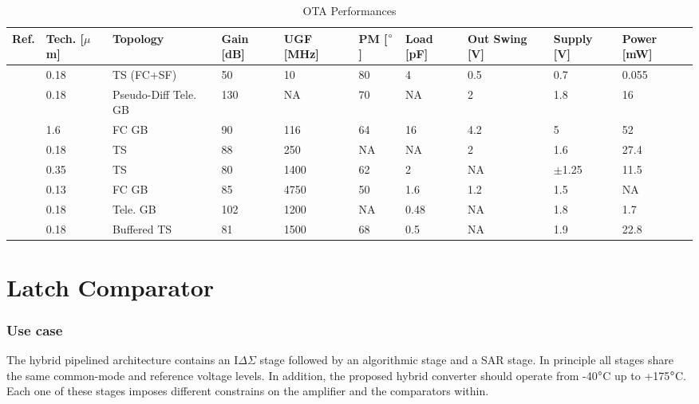 \begin{table}[htp]
	\caption{OTA Performances}
	\centering
	\label{table:ota_comparison_table}
	\begin{tabular}{L{5\charwidth} L{4.2\charwidth} L{11\charwidth} R{4.5\charwidth} R{4.5\charwidth} R{3.5\charwidth} R{4.5\charwidth} C{9\charwidth} C{6.2\charwidth} C{5.5\charwidth}}
	\toprule
	Ref. & Tech. [\(\mu \)m] & Topology & Gain [dB] & UGF [MHz] & PM [\(\degree \)] & Load [pF] & Out Swing [V] & Supply [V] & Power [mW] \\
    \midrule
    \cite{Sauerbrey2002}  & 0.18 & TS (FC+SF\footnotemark[1]) & 50  &   10 & 80 & 4    & 0.5 & 0.7 & 0.055 \\
    \cite{Chiu2004}       & 0.18 & Pseudo-Diff Tele. GB       & 130 &   NA & 70 &   NA & 2\footnotemark[2] & 1.8 & 16 \\
    \cite{Bult1991}       &  1.6 & FC GB                      & 90  &  116 & 64 & 16   & 4.2 & 5 & 52 \\
    \cite{Miyahara2014}   & 0.18 & TS                         & 88  &  250 & NA &   NA & 2\footnotemark[2] & 1.6 & 27.4 \\
    \cite{Thandri2006}    & 0.35 & TS                         & 80  & 1400 & 62 &  2   & NA & \(\pm \)1.25 & 11.5 \\
    \cite{Zhang2015PRIME} & 0.13 & FC GB                      & 85  & 4750 & 50 &  1.6 & 1.2 & 1.5 & NA \\
    \cite{Liu2015OpAmp}   & 0.18 & Tele. GB                   & 102 & 1200 & NA & 0.48 & NA  & 1.8 & 1.7 \\
    \cite{Sun2016}        & 0.18 & Buffered TS                & 81  & 1500 & 68 &  0.5 & NA  & 1.9 & 22.8 \\
	\bottomrule
	\end{tabular}
\end{table}

\section{Latch Comparator}                       %
\label{sec:comp-delay-design}
    \subsubsection{Use case}                     %
The hybrid pipelined architecture contains an I\(\Delta\Sigma \) stage followed by an algorithmic stage and a SAR stage. In principle all stages share the same common-mode and reference voltage levels. In addition, the proposed hybrid converter should operate from -40\(\degree \)C up to +175\(\degree \)C. Each one of these stages imposes different constrains on the amplifier and the comparators within.
    
